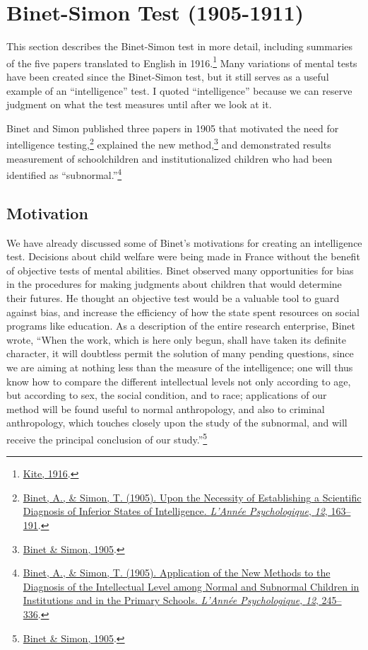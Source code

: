 \documentclass[
  oneside,
  12pt]{crumpbook}
\begin{document}
\hypertarget{binet-simon-test-1905-1911}{%
\section{Binet-Simon Test (1905-1911)}\label{binet-simon-test-1905-1911}}

This section describes the Binet-Simon test in more detail, including summaries of the five papers translated to English in 1916.\footnote{\protect\hyperlink{ref-kiteDevelopmentIntelligenceChildren1916}{Kite, 1916}.} Many variations of mental tests have been created since the Binet-Simon test, but it still serves as a useful example of an ``intelligence'' test. I quoted ``intelligence'' because we can reserve judgment on what the test measures until after we look at it.

Binet and Simon published three papers in 1905 that motivated the need for intelligence testing,\footnote{\protect\hyperlink{ref-binetNecessityEstablishingScientific1905}{Binet, A., \& Simon, T. (1905). Upon the {Necessity} of {Establishing} a {Scientific Diagnosis} of {Inferior States} of {Intelligence}. \emph{L'Année Psychologique}, \emph{12}, 163--191}.} explained the new method,\footnote{\protect\hyperlink{ref-binetNewMethodsDiagnosis1905}{Binet \& Simon, 1905}.} and demonstrated results measurement of schoolchildren and institutionalized children who had been identified as ``subnormal.''\footnote{\protect\hyperlink{ref-binetApplicationNewMethods1905}{Binet, A., \& Simon, T. (1905). Application of the {New Methods} to the {Diagnosis} of the {Intellectual Level} among {Normal} and {Subnormal Children} in {Institutions} and in the {Primary Schools}. \emph{L'Année Psychologique}, \emph{12}, 245--336}.}

\hypertarget{motivation}{%
\subsection{Motivation}\label{motivation}}

We have already discussed some of Binet's motivations for creating an intelligence test. Decisions about child welfare were being made in France without the benefit of objective tests of mental abilities. Binet observed many opportunities for bias in the procedures for making judgments about children that would determine their futures. He thought an objective test would be a valuable tool to guard against bias, and increase the efficiency of how the state spent resources on social programs like education. As a description of the entire research enterprise, Binet wrote, ``When the work, which is here only begun, shall have taken its definite character, it will doubtless permit the solution of many pending questions, since we are aiming at nothing less than the measure of the intelligence; one will thus know how to compare the different intellectual levels not only according to age, but according to sex, the social condition, and to race; applications of our method will be found useful to normal anthropology, and also to criminal anthropology, which touches closely upon the study of the subnormal, and will receive the principal conclusion of our study.''\footnote{\protect\hyperlink{ref-binetApplicationNewMethods1905}{Binet \& Simon, 1905}.}
\end{document}
